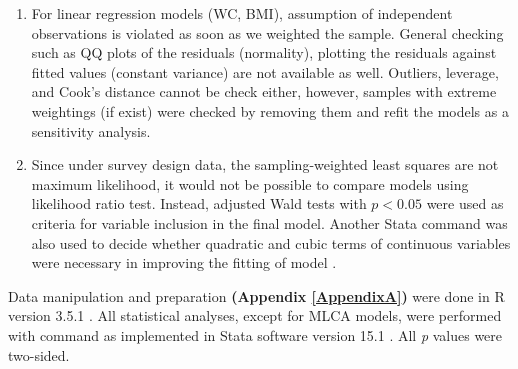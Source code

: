\begin{enumerate}
	\item For linear regression models (WC, BMI), assumption of independent observations is violated as soon as we weighted the sample. General checking such as QQ plots of the residuals (normality), plotting the residuals against fitted values (constant variance) are not available as well. Outliers, leverage, and Cook's distance cannot be check either, however, samples with extreme weightings (if exist) were checked by removing them and refit the models as a sensitivity analysis.
	\item Since under survey design data, the sampling-weighted least squares are not maximum likelihood, it would not be possible to compare models using likelihood ratio test. Instead, adjusted Wald tests with $p < 0.05$ were used as criteria for variable inclusion in the final model. Another Stata command  was also used to  decide whether quadratic and cubic terms of continuous variables were necessary in improving the fitting of model \parencite{pregibon1980goodness}. 
\end{enumerate}

Data manipulation and preparation \textbf{(Appendix \ref{AppendixA})} were done in R version 3.5.1 \parencite{R3.5.1}. All statistical analyses, except for MLCA models, were performed with  command as implemented in Stata software version 15.1 \parencite{stata15}. All \textit{p} values were two-sided.
